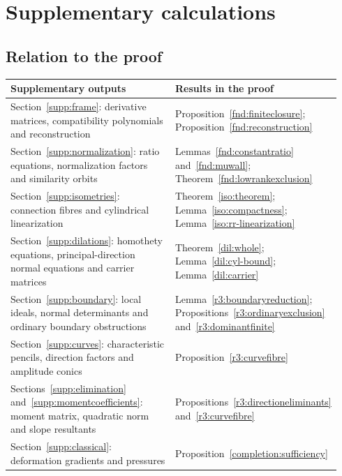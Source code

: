 \clearpage
\begingroup
\edef\suppSavedSection{\number\value{section}}
\edef\suppSavedEquation{\number\value{equation}}
\edef\suppSavedTable{\number\value{table}}
\fontsize{10}{12}\selectfont
\let\small\footnotesize
\renewcommand{\thesection}{S\arabic{section}}
\renewcommand{\theHsection}{supp.\arabic{section}}
\renewcommand{\thetable}{S\arabic{table}}
\renewcommand{\theHtable}{supp.\arabic{table}}
\setcounter{section}{0}
\setcounter{equation}{0}
\setcounter{table}{0}
\makeatletter
\@fleqntrue
\@mathmargin=0pt
\makeatother
\let\suppaligned\aligned
\let\endsuppaligned\endaligned
\section*{Supplementary calculations}
\label{sec:supplementary-calculations}

\subsection*{Relation to the proof}
\noindent\begin{tabular}{@{}>{\raggedright\arraybackslash}p{0.51\linewidth}
                       >{\raggedright\arraybackslash}p{0.43\linewidth}@{}}
\toprule Supplementary outputs & Results in the proof\\\midrule
Section~\ref{supp:frame}: derivative matrices, compatibility polynomials
and reconstruction & Proposition~\ref{fnd:finiteclosure};
Proposition~\ref{fnd:reconstruction}\\[7pt]
Section~\ref{supp:normalization}: ratio equations, normalization factors
and similarity orbits & Lemmas~\ref{fnd:constantratio}
and~\ref{fnd:muwall}; Theorem~\ref{fnd:lowrankexclusion}\\[7pt]
Section~\ref{supp:isometries}: connection fibres and cylindrical
linearization & Theorem~\ref{iso:theorem};
Lemma~\ref{iso:compactness}; Lemma~\ref{iso:rr-linearization}\\[7pt]
Section~\ref{supp:dilations}: homothety equations, principal-direction
normal equations and carrier matrices & Theorem~\ref{dil:whole};
Lemma~\ref{dil:cyl-bound}; Lemma~\ref{dil:carrier}\\[7pt]
Section~\ref{supp:boundary}: local ideals, normal determinants
and ordinary boundary obstructions & Lemma~\ref{r3:boundaryreduction};
Propositions~\ref{r3:ordinaryexclusion}
and~\ref{r3:dominantfinite}\\[7pt]
Section~\ref{supp:curves}: characteristic pencils, direction factors
and amplitude conics & Proposition~\ref{r3:curvefibre}\\[7pt]
Sections~\ref{supp:elimination} and~\ref{supp:momentcoefficients}:
moment matrix, quadratic norm and slope resultants &
Propositions~\ref{r3:directioneliminants}
and~\ref{r3:curvefibre}\\[7pt]
Section~\ref{supp:classical}: deformation gradients and pressures &
Proposition~\ref{completion:sufficiency}\\
\bottomrule
\end{tabular}

